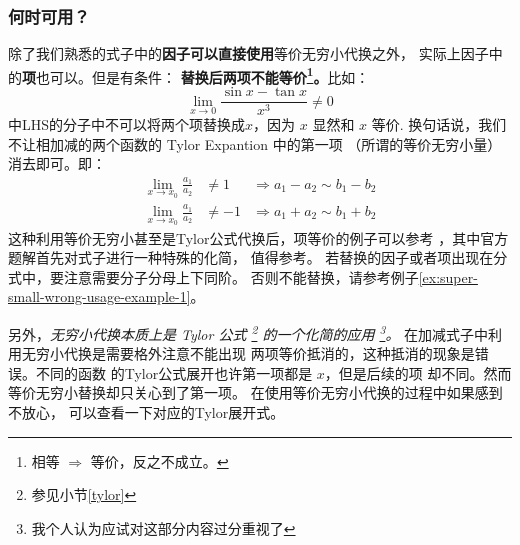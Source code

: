 \subsubsection{何时可用？}

除了我们熟悉的式子中的\textbf{因子可以直接使用}等价无穷小代换之外，
实际上因子中的\textbf{项}也可以。但是有条件：
\textbf{替换后两项不能等价\footnote{相等 $\Rightarrow$ 等价，反之不成立。}。}比如：
\[
    \lim_{x \to 0} \frac{\sin{x} - \tan{x} }{x^3} \neq 0
\]
中LHS的分子中不可以将两个项替换成$x$，因为 $x$ 显然和 $x$ 等价.
换句话说，我们不让相加减的两个函数的 Tylor Expantion 中的第一项
（所谓的等价无穷小量）消去即可。即：
\begin{align}
	\lim_{ x\to x_0 } \frac{a_1}{a_2} &\neq 1  &\Rightarrow a_1 - a_2 \sim b_1 - b_2 \\
	\lim_{ x\to x_0 } \frac{a_1}{a_2} &\neq -1 &\Rightarrow a_1 + a_2 \sim b_1 + b_2
\end{align}
这种利用等价无穷小甚至是Tylor公式代换后，项等价的例子可以参考
\cite[question 130]{w660}，其中官方题解首先对式子进行一种特殊的化简，
值得参考。
若替换的因子或者项出现在分式中，要注意需要分子分母上下同阶。
否则不能替换，请参考例子\ref{ex:super-small-wrong-usage-example-1}。

另外，\emph{无穷小代换本质上是 Tylor 公式
\footnote{
    参见小节\ref{tylor}
}
的一个化简的应用
\footnote{我个人认为应试对这部分内容过分重视了}。}
在加减式子中利用无穷小代换是需要格外注意不能出现
两项等价抵消的，这种抵消的现象是错误。不同的函数
的Tylor公式展开也许第一项都是 $x$，但是后续的项
却不同。然而等价无穷小替换却只关心到了第一项。
在使用等价无穷小代换的过程中如果感到不放心，
可以查看一下对应的Tylor展开式。

